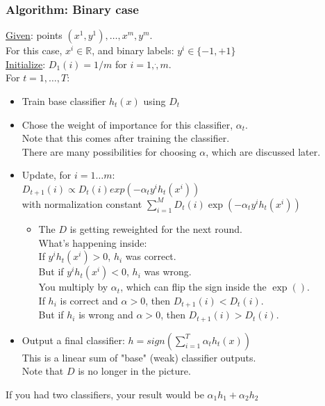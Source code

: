 \subsubsection{Algorithm: Binary case}
\underline{Given}: points $(x^1, y^1), \dots, x^m, y^m$.  \hfill \\
For this case, $x^i \in \mathbb{R}$, and binary labels: $y^i \in \{-1, +1\}$ \hfill \\
\underline{Initialize}: $D_1(i) = 1/m$ for $i=1, \dot, m$.  \hfill \\
For $t = 1, \dots, T:$
\begin{itemize}
	\item Train base classifier $h_t(x)$ using $D_t$
	\item Chose the weight of importance for this classifier, $\alpha_t$. \hfill \\
		Note that this comes after training the classifier.  \hfill \\
		There are many possibilities for choosing $\alpha$, which are discussed later.  \hfill \\
	\item Update, for $i= 1 \dots m$:  \hfill \\
		$D_{t+1}(i) \propto D_t(i) exp(-\alpha_t y^i h_t(x^i))$ \hfill \\
				with normalization constant $\displaystyle \sum_{i=1}^M D_t(i) \exp(-\alpha_t y^i h_t(x^i))$ 
		\begin{itemize}
			\item The $D$ is getting reweighted for the next round.  \hfill \\
			What's happening inside: \hfill \\
			If $y^i h_t(x^i) > 0$, $h_i$ was correct.  \hfill \\
			But if $y^i h_t(x^i) < 0$, $h_i$ was wrong.  \hfill \\
			You multiply by $\alpha_t$, which can flip the sign inside the $\exp()$. \hfill \\
			If $h_i$ is correct and $\alpha > 0$, then $D_{t+1}(i) < D_t(i)$.  \hfill \\
			But if $h_i$ is wrong and $\alpha > 0$, then $D_{t+1}(i) > D_t(i)$.  \hfill \\
		\end{itemize}
	\item Output a final classifier: $\displaystyle h = sign \left( \sum_{i=1}^T \alpha_t h_t(x) \right)$ \hfill \\
		This is a linear sum of "base" (weak) classifier outputs. \hfill \\
		Note that $D$ is no longer in the picture. 		
\end{itemize}
If you had two classifiers, your result would be $\alpha_1 h_1 + \alpha_2 h_2$

